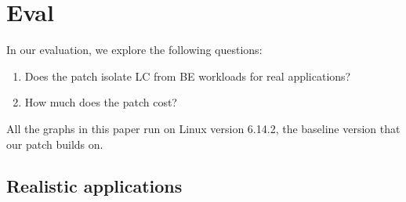 \section{Eval}
\label{s:eval}

In our evaluation, we explore the following questions:
\begin{enumerate}
    \item Does the patch isolate LC from BE workloads for real applications?
    \item How much does the patch cost?
\end{enumerate}

All the graphs in this paper run on Linux version 6.14.2, the baseline version
that our patch builds on.

\subsection{Realistic applications}


